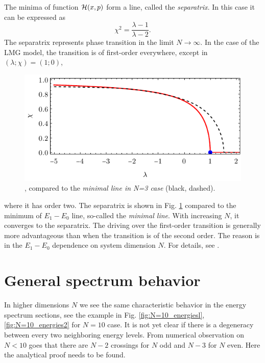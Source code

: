 The minima of function $\mathcal{H}(x,p)$ form a line, called the \emph{separatrix}. In this case it can be expressed as
\begin{equation}
    \chi^2=\frac{\lambda-1}{\lambda-2}.
    \label{eq:separatrix}
\end{equation}
The separatrix represents phase transition in the limit $N\rightarrow \infty$. In the case of the LMG model, the transition is of first-order everywhere, except in $(\lambda;\chi)=(1;0)$, 
\begin{figure}[h]
    \centering
    \includegraphics[scale=1.2]{../img/infiniteN_transitionCompare.pdf}
    \caption{,  compared to the \emph{minimal line in N=3 case} (black, dashed).}
    \label{fig:transitionCompare}    
\end{figure}
where it has order two. The separatrix is shown in Fig. \ref{fig:transitionCompare} compared to the minimum of $E_1-E_0$ line, so-called the \emph{minimal line}. With increasing $N$, it converges to the separatrix. The driving over the first-order transition is generally more advantageous than when the transition is of the second order. The reason is in the $E_1-E_0$ dependence on system dimension $N$. For details, see \citet{shuetzhold}.











\section{General spectrum behavior}
In higher dimensions $N$ we see the same characteristic behavior in the energy spectrum sections, see the example in Fig. \ref{fig:N=10_energiesl}, \ref{fig:N=10_energies2} for $N=10$ case. It is not yet clear if there is a degeneracy between every two neighboring energy levels. From numerical observation on $N<10$ goes that there are $N-2$ crossings for $N$ odd and $N-3$ for $N$ even. Here the analytical proof needs to be found.


